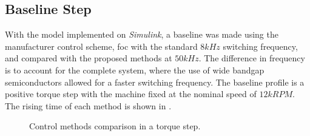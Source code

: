 \subsection{Baseline Step}
With the model implemented on \textit{Simulink}, a baseline was made using the manufacturer control scheme, \gls{foc} with the standard $8kHz$ switching frequency, and compared with the proposed methods at $50kHz$. The difference in frequency is to account for the complete system, where the use of wide bandgap semiconductors allowed for a faster switching frequency. The baseline profile is a positive torque step with the machine fixed at the nominal speed of $12kRPM$. The rising time of each method is shown in .
\begin{figure}[!htb]
	\centering
	\begin{subfigmatrix}{1}
	\end{subfigmatrix}	
	\begin{subfigmatrix}{1}
	\end{subfigmatrix}
	\caption[Control methods comparison in a torque step.]{Control methods comparison in a torque step.}
	\label{fig:rising_time_4_models} %
\end{figure}

